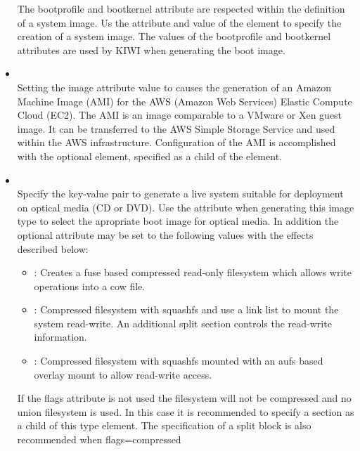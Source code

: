\begin{itemize}
      The bootprofile and bootkernel attribute are respected within the 
      definition of a system image. Us the attribute and value 
       of the  element to specify the
      creation of a system image. The values of the bootprofile and 
      bootkernel attributes are used by KIWI when generating the boot image.
\item {}\\
      Setting the image attribute value to  causes the generation of
      an Amazon Machine Image (AMI) for the AWS (Amazon Web Services) 
      Elastic Compute Cloud (EC2). The AMI is an image comparable to
      a VMware or Xen guest image. It can be transferred to the AWS 
      Simple Storage Service and used within the AWS infrastructure.
      Configuration of the AMI is accomplished with the optional
       element, specified as a child of the 
      element.
\pagebreak
\item {}\\
      Specify the key-value pair  to generate a live system suitable
      for deployment on optical media (CD or DVD). Use the 
       attribute when generating this image
      type to select the apropriate boot image for optical media. In 
      addition the optional  attribute may be set to the
      following values with the effects described below:
      \begin{itemize}
      \item {}: Creates a fuse based compressed read-only
            filesystem which allows write operations into a cow file.
      \item {}: Compressed filesystem with squashfs and
            use a link list to mount the system read-write. An additional
            split section controls the read-write information.
      \item {}: Compressed filesystem with squashfs mounted
            with an aufs based overlay mount to allow read-write access.
      \end{itemize}
      If the flags attribute is not used the filesystem will not be compressed
      and no union filesystem is used. In this case it is recommended to
      specify a  section as a child of this type element. The
      specification of a split block is also recommended when flags=compressed

\end{itemize}

